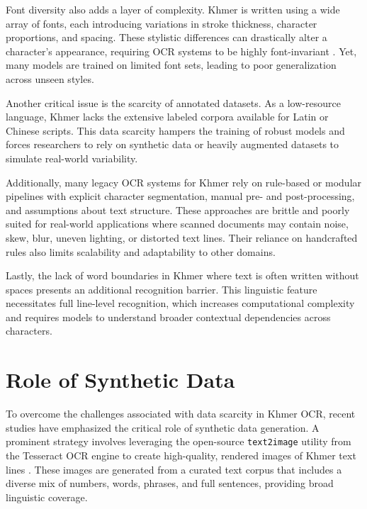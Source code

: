 {Font diversity also adds a layer of complexity. Khmer is written using a wide array of fonts, each 
introducing variations in stroke thickness, character proportions, and spacing. These stylistic 
differences can drastically alter a character's appearance, requiring OCR systems to be highly 
font-invariant \citep{buoy2021seq2seq}. Yet, many models are trained on limited font sets, leading 
to poor generalization across unseen styles.

Another critical issue is the scarcity of annotated datasets. As a low-resource language, Khmer lacks 
the extensive labeled corpora available for Latin or Chinese scripts. This data scarcity hampers the 
training of robust models and forces researchers to rely on synthetic data or heavily augmented datasets 
to simulate real-world variability.

Additionally, many legacy OCR systems for Khmer rely on rule-based or modular pipelines with explicit 
character segmentation, manual pre- and post-processing, and assumptions about text structure. These 
approaches are brittle and poorly suited for real-world applications where scanned documents may contain 
noise, skew, blur, uneven lighting, or distorted text lines. Their reliance on handcrafted rules also 
limits scalability and adaptability to other domains.

Lastly, the lack of word boundaries in Khmer where text is often written without spaces presents an 
additional recognition barrier. This linguistic feature necessitates full line-level recognition, 
which increases computational complexity and requires models to understand broader contextual dependencies 
across characters.



\section{Role of Synthetic Data}
\label{sec:dl-models}

To overcome the challenges associated with data scarcity in Khmer OCR, 
recent studies have emphasized the critical role of synthetic data generation. A prominent 
strategy involves leveraging the open-source \texttt{text2image} utility from the Tesseract OCR 
engine to create high-quality, rendered images of Khmer text lines \citep{buoy2021seq2seq}. 
These images are generated from a curated text corpus that includes a diverse mix of numbers, 
words, phrases, and full sentences, providing broad linguistic coverage.

}
